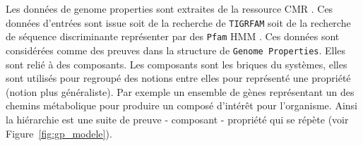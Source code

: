 \begin{refsegment}
    Les données de genome properties sont extraites de la ressource \acrfull{CMR} \cite{peterson2001comprehensive,davidsen2009comprehensive}. Ces données d'entrées sont issue soit de la recherche de \texttt{TIGRFAM} \cite{haft2003tigrfams}\label{key} soit de la recherche de séquence discriminante représenter par des \texttt{Pfam} \acrfull{HMM} \cite{bateman2000pfam,bateman2002pfam,bateman2004pfam,finn2008pfam,finn2009pfam,punta2011pfam,finn2013pfam,finn2016pfam}. Ces données sont considérées comme des preuves dans la structure de \texttt{Genome Properties}. Elles sont relié à des composants. Les composants sont les briques du systèmes, elles sont utilisés pour regroupé des notions entre elles pour représenté une propriété (notion plus généraliste). Par exemple un ensemble de gènes représentant un des chemins métabolique pour produire un composé d'intérêt pour l'organisme. Ainsi la hiérarchie est une suite de preuve - composant - propriété qui se répète (voir Figure~\cref{fig:gp_modele}).
    

\end{refsegment}
